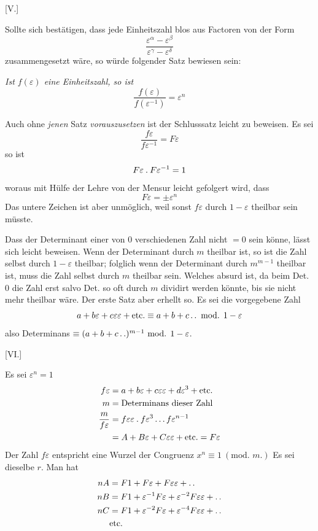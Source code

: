 %
\begin{center}[V.]\end{center}
Sollte sich bestätigen, dass jede Einheitszahl blos aus Factoren von der Form
\[
\frac{\varepsilon^\alpha-\varepsilon^\beta}{\varepsilon^\gamma-\varepsilon^\delta}
\]
zusammengesetzt wäre, so würde folgender Satz bewiesen sein:

\emph{Ist $f(\varepsilon)$ eine Einheitszahl, so ist}
\[
\frac{f(\varepsilon)}{f(\varepsilon^{-1})}=\varepsilon^n
\]

Auch ohne \emph{jenen} Satz \emph{vorauszusetzen} ist der Schlusssatz leicht zu beweisen.
Es sei
\[
\frac{f\varepsilon}{f\varepsilon^{-1}}=F\varepsilon
\]
so ist
\[
F\varepsilon\mathbin{.} F\varepsilon^{-1}=1
\]
woraus mit Hülfe der Lehre von der Mensur leicht gefolgert wird, dass
\[
F\varepsilon=\pm\varepsilon^n
\]
Das untere Zeichen ist aber unmöglich, weil sonst $f\varepsilon$ durch $1-\varepsilon$ theilbar sein müsste.

Dass der Determinant einer von $0$ verschiedenen Zahl nicht $=0$ sein könne, lässt sich leicht beweisen. Wenn der Determinant durch $m$ theilbar ist, so ist die Zahl selbst durch $1-\varepsilon$ theilbar; folglich wenn der Determinant durch $m^{m-1}$ theilbar ist, muss die Zahl selbst durch $m$ theilbar sein. Welches absurd ist, da beim Det. $0$ die Zahl erst salvo Det. so oft durch $m$ dividirt werden könnte, bis sie nicht mehr theilbar wäre. Der erste Satz aber erhellt so. Es sei die vorgegebene Zahl
\[
a+b\varepsilon+c\varepsilon\varepsilon+\text{etc.}\equiv a+b+c\mathinner{.\,.}\text{ mod. }1-\varepsilon
\]
also Determinans $\equiv(a+b+c\mathinner{.\,.})^{m-1}\text{ mod. }1-\varepsilon$.

%
\begin{center}[VI.]\end{center}
Es sei $\varepsilon^n=1$
\[
\begin{aligned}
f\varepsilon&=a+b\varepsilon+c\varepsilon\varepsilon+d\varepsilon^3+\text{etc.}\\
m&=\text{Determinans dieser Zahl}\\
\frac{m}{f\varepsilon}&=f\varepsilon\varepsilon\mathbin{.} f\varepsilon^3\ldots f\varepsilon^{n-1}\\
&=A+B\varepsilon+C\varepsilon\varepsilon+\text{etc.}=F\varepsilon
\end{aligned}
\]
Der Zahl $f\varepsilon$ entspricht eine Wurzel der Congruenz $x^n\equiv1\ (\text{mod. }m.)$ Es sei dieselbe $r$. Man hat
\[
\begin{aligned}
nA&=F1+F\varepsilon+F\varepsilon\varepsilon+\mathinner{.\,.}\\
nB&=F1+\varepsilon^{-1}F\varepsilon+\varepsilon^{-2}F\varepsilon\varepsilon+\mathinner{.\,.}\\
nC&=F1+\varepsilon^{-2}F\varepsilon+\varepsilon^{-4}F\varepsilon\varepsilon+\mathinner{.\,.}\\
&\text{etc.}
\end{aligned}
\]

